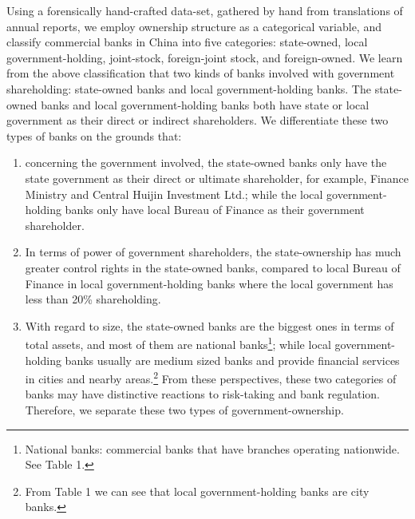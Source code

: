 \documentclass{article}
\begin{document}
Using a forensically hand-crafted data-set, gathered by hand from
translations of annual reports, we employ ownership structure as a
categorical variable, and classify commercial banks in China into five
categories: state-owned, local government-holding, joint-stock,
foreign-joint stock, and foreign-owned. We learn from the above
classification that two kinds of banks involved with government
shareholding: state-owned banks and local government-holding banks. The
state-owned banks and local government-holding banks both have state or
local government as their direct or indirect shareholders. We
differentiate these two types of banks on the grounds that:

\begin{enumerate}
\def\labelenumi{\arabic{enumi}.}
\item
  concerning the government involved, the state-owned banks only have
  the state government as their direct or ultimate shareholder, for
  example, Finance Ministry and Central Huijin Investment Ltd.; while
  the local government-holding banks only have local Bureau of Finance
  as their government shareholder.
\item
  In terms of power of government shareholders, the state-ownership has
  much greater control rights in the state-owned banks, compared to
  local Bureau of Finance in local government-holding banks where the
  local government has less than 20\% shareholding.
\item
  With regard to size, the state-owned banks are the biggest ones in
  terms of total assets, and most of them are national banks\footnote{National
    banks: commercial banks that have branches operating nationwide. See
    Table 1.}; while local government-holding banks usually are medium
  sized banks and provide financial services in cities and nearby
  areas.\footnote{From Table 1 we can see that local government-holding
    banks are city banks.} From these perspectives, these two categories
  of banks may have distinctive reactions to risk-taking and bank
  regulation. Therefore, we separate these two types of
  government-ownership.
\end{enumerate}
\end{document}
